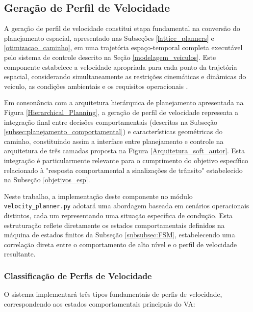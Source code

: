 \subsection{Geração de Perfil de Velocidade}\label{subsubsec:geracao_de_perfil_de_velocidade}

A geração de perfil de velocidade constitui etapa fundamental na conversão do planejamento espacial, apresentado nas Subseções \ref{lattice_planners} e \ref{otimizacao_caminho}, em uma trajetória espaço-temporal completa executável pelo sistema de controle descrito na Seção \ref{modelagem_veiculos}. Este componente estabelece a velocidade apropriada para cada ponto da trajetória espacial, considerando simultaneamente as restrições cinemáticas e dinâmicas do veículo, as condições ambientais e os requisitos operacionais \cite{paden2016survey}.

Em consonância com a arquitetura hierárquica de planejamento apresentada na Figura \ref{Hierarchical_Planning}, a geração de perfil de velocidade representa a integração final entre decisões comportamentais (descritas na Subseção \ref{subsec:planejamento_comportamental}) e características geométricas do caminho, constituindo assim a interface entre planejamento e controle na arquitetura de três camadas proposta na Figura \ref{Arquitetura_soft_autor}. Esta integração é particularmente relevante para o cumprimento do objetivo específico relacionado à "resposta comportamental a sinalizações de trânsito" estabelecido na Subseção \ref{objetivos_esp}.

Neste trabalho, a implementação deste componente no módulo \texttt{velocity\_planner.py} adotará uma abordagem baseada em cenários operacionais distintos, cada um representando uma situação específica de condução. Esta estruturação reflete diretamente os estados comportamentais definidos na máquina de estados finitos da Subseção \ref{subsubsec:FSM}, estabelecendo uma correlação direta entre o comportamento de alto nível e o perfil de velocidade resultante.

\subsubsection{Classificação de Perfis de Velocidade} \label{subsubsec:classificao_perfil}

O sistema implementará três tipos fundamentais de perfis de velocidade, correspondendo aos estados comportamentais principais do VA:

